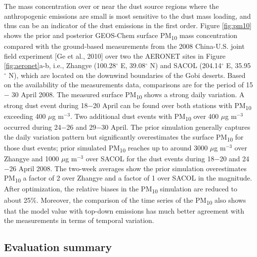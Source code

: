  The mass concentration over or near the dust source regions
 where the anthropogenic emissions are small is most sensitive to the dust mass loading,
 and thus can be an indicator of the dust emissions in the first order.
 Figure \ref{fig:pm10} shows the prior and posterior GEOS-Chem surface
 PM\textsubscript{10} mass concentration compared with the ground-based measurements
 from the 2008 China-U.S. joint field experiment [Ge et al., 2010] over two the AERONET sites
 in Figure \ref{fig:aeronet}a-b, i.e., Zhangye (100.28$^{\circ}$ E, 39.08$^{\circ}$ N)
 and SACOL (204.14$^{\circ}$ E, 35.95$^{\circ}$ N), which are located
 on the downwind boundaries of the Gobi deserts.
 Based on the availability of the measurements data, comparisons are for the period of 15 $-$ 30 April 2008.
 The measured surface PM\textsubscript{10} shows a strong daily variation.
 A strong dust event during 18$-$20 April can be found over both stations with
 PM\textsubscript{10} exceeding 400 $\mu$g m$^{-3}$.
 Two additional dust events with PM\textsubscript{10} over 400 $\mu$g m$^{-3}$ occurred during
 24$-$26 and 29$-$30 April.
 The prior simulation generally captures the daily variation pattern
 but significantly overestimates the surface PM\textsubscript{10} for those dust events;
 prior simulated PM\textsubscript{10} reaches up to around 3000 $\mu$g m$^{-3}$ over Zhangye
 and 1000 $\mu$g m$^{-3}$ over SACOL for the dust events during 18$-$20 and 24$-$26 April 2008.
 The two-week averages show the prior simulation overestimates PM\textsubscript{10}
 a factor of 2 over Zhangye and a factor of 1 over SACOL in the magnitude.
 After optimization, the relative biases in the PM\textsubscript{10} simulation are reduced to about 25\%.
 Moreover, the comparison of the time series of the PM\textsubscript{10} also shows that
 the model value with top-down emissions has much better agreement
 with the measurements in terms of temporal variation.

 \subsection{Evaluation summary}

